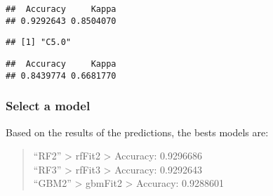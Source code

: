 \documentclass[
]{article}
\newenvironment{Shaded}{\begin{snugshade}}{\end{snugshade}}
\newcommand{\CommentTok}[1]{\textcolor[rgb]{0.56,0.35,0.01}{\textit{#1}}}
\newcommand{\FunctionTok}[1]{\textcolor[rgb]{0.00,0.00,0.00}{#1}}
\newcommand{\NormalTok}[1]{#1}
\newcommand{\OtherTok}[1]{\textcolor[rgb]{0.56,0.35,0.01}{#1}}
\newcommand{\SpecialCharTok}[1]{\textcolor[rgb]{0.00,0.00,0.00}{#1}}
\newcommand{\StringTok}[1]{\textcolor[rgb]{0.31,0.60,0.02}{#1}}
\begin{document}
\begin{verbatim}
##  Accuracy     Kappa 
## 0.9292643 0.8504070
\end{verbatim}

\begin{Shaded}
\end{Shaded}

\begin{verbatim}
## [1] "C5.0"
\end{verbatim}

\begin{Shaded}
\end{Shaded}

\begin{verbatim}
##  Accuracy     Kappa 
## 0.8439774 0.6681770
\end{verbatim}

\begin{Shaded}
\end{Shaded}

\hypertarget{select-a-model}{%
\subsubsection{Select a model}\label{select-a-model}}

Based on the results of the predictions, the bests models are:

\begin{quote}
``RF2'' \textgreater{} rfFit2 \textgreater{} Accuracy: 0.9296686\\
``RF3'' \textgreater{} rfFit3 \textgreater{} Accuracy: 0.9292643\\
``GBM2'' \textgreater{} gbmFit2 \textgreater{} Accuracy: 0.9288601
\end{quote}
\end{document}
